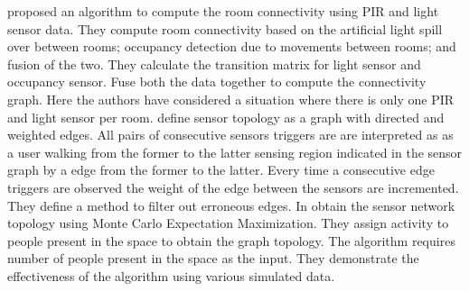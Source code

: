  \citeauthor{ellis2012creating}\cite{ellis2012creating} proposed an algorithm to compute the room connectivity using  PIR and light sensor data. They compute room connectivity based on the artificial light spill over between rooms; occupancy detection due to movements between
  rooms; and fusion of the two. They calculate the transition matrix for light sensor and occupancy sensor. Fuse both the data together to compute the connectivity graph. Here the authors have considered a situation where there is only one PIR and light sensor per room.
\citeauthor{muller2014automated} define  sensor topology as a graph with directed and weighted edges. All pairs of consecutive sensors triggers are are interpreted as as a user walking from the former to the latter sensing region indicated in the sensor 
graph by a edge from the former to the latter. Every time a consecutive edge triggers are observed the weight of the edge between the sensors are incremented. They define a method to filter out erroneous edges.
In \cite{marinakis2005learning} \citeauthor{marinakis2005learning} obtain the sensor network topology using Monte Carlo Expectation Maximization. They assign activity to people present in the space to obtain the graph topology. The algorithm requires number of people present in the space as the input. They demonstrate the effectiveness of the algorithm using various simulated data. 




